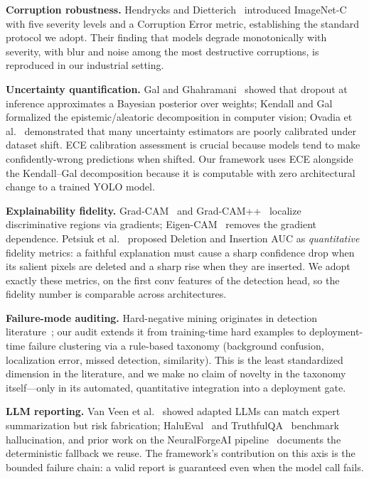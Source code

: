 \documentclass[10pt,twocolumn,letterpaper]{article}
\begin{document}
\textbf{Corruption robustness.} Hendrycks and Dietterich~\cite{hendrycks2019benchmarking} introduced ImageNet-C with five severity levels and a Corruption Error metric, establishing the standard protocol we adopt. Their finding that models degrade monotonically with severity, with blur and noise among the most destructive corruptions, is reproduced in our industrial setting.

\textbf{Uncertainty quantification.} Gal and Ghahramani~\cite{gal2016dropout} showed that dropout at inference approximates a Bayesian posterior over weights; Kendall and Gal~\cite{kendall2017uncertainties} formalized the epistemic/aleatoric decomposition in computer vision; Ovadia et al.~\cite{ovadia2019can} demonstrated that many uncertainty estimators are poorly calibrated under dataset shift. ECE calibration assessment is crucial because models tend to make confidently-wrong predictions when shifted. Our framework uses ECE alongside the Kendall--Gal decomposition because it is computable with zero architectural change to a trained YOLO model.

\textbf{Explainability fidelity.} Grad-CAM~\cite{selvaraju2017grad} and Grad-CAM++~\cite{chattopadhay2018gradcam} localize discriminative regions via gradients; Eigen-CAM~\cite{muhammad2018eigencam} removes the gradient dependence. Petsiuk et al.~\cite{petsiuk2018rise} proposed Deletion and Insertion AUC as \emph{quantitative} fidelity metrics: a faithful explanation must cause a sharp confidence drop when its salient pixels are deleted and a sharp rise when they are inserted. We adopt exactly these metrics, on the first conv features of the detection head, so the fidelity number is comparable across architectures.

\textbf{Failure-mode auditing.} Hard-negative mining originates in detection literature~\cite{shrivastava2016training}; our audit extends it from training-time hard examples to deployment-time failure clustering via a rule-based taxonomy (background confusion, localization error, missed detection, similarity). This is the least standardized dimension in the literature, and we make no claim of novelty in the taxonomy itself---only in its automated, quantitative integration into a deployment gate.

\textbf{LLM reporting.} Van Veen et al.~\cite{vanveen2023adapted} showed adapted LLMs can match expert summarization but risk fabrication; HaluEval~\cite{li2023halueval} and TruthfulQA~\cite{lin2022truthfulqa} benchmark hallucination, and prior work on the NeuralForgeAI pipeline~\cite{wyoloservice2} documents the deterministic fallback we reuse. The framework's contribution on this axis is the bounded failure chain: a valid report is guaranteed even when the model call fails.
\end{document}
